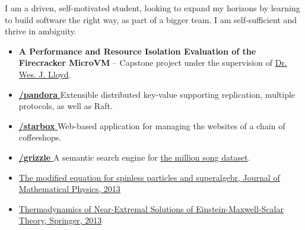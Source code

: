 

\begin{flushleft}
\justifying
I am a driven, self-motivated student, looking to expand my horizons by learning to build
software the right way, as part of a bigger team. I am self-sufficient and thrive in ambiguity.

\end{flushleft}


\small
{}


\begin{itemize}
    \item \justifying \textbf{A Performance and Resource Isolation Evaluation of the Firecracker MicroVM} -- Capstone project under the supervision of \href{http://faculty.washington.edu/wlloyd/}{Dr. Wes. J. Lloyd}.
    \item \justifying \href{https://github.com/zsadeghi/pandora}{\githubsymbol \textbf{/pandora} \externalLink} Extensible distributed key-value supporting replication, multiple protocols, as well as Raft. 
    \item \justifying \href{https://github.com/zsadeghi/starbox}{\githubsymbol \textbf{/starbox} \externalLink} Web-based application for managing the websites of a chain of coffeeshops.
    \item \justifying \href{https://github.com/zsadeghi/grizzle}{\githubsymbol \textbf{/grizzle} \externalLink} A semantic search engine for \href{http://millionsongdataset.com/}{the million song dataset}.
\end{itemize}


\begin{itemize}
    \item \href{https://dx.doi.org/10.1063/1.4823715}{The modified equation for spinless particles and superalgebr, Journal of Mathematical Physics, 2013 \externalLink}
    \item \href{https://link.springer.com/article/10.1007/s10773-013-1542-2#page-1}{Thermodynamics of Near-Extremal Solutions of Einstein-Maxwell-Scalar Theory, Springer, 2013 \externalLink}
\end{itemize}






